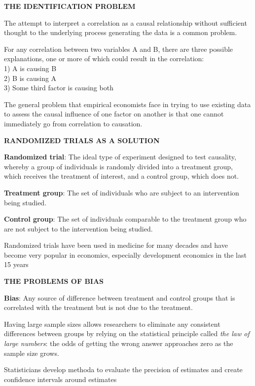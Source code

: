 \documentclass[landscape]{slides}
\begin{document}
\begin{slide}
\begin{center}
{\bf THE IDENTIFICATION PROBLEM}
\end{center}

The attempt to interpret a correlation as a causal relationship without sufficient thought to the underlying process generating the data is a common problem.

For any correlation between two variables A and B, there are three possible explanations, one or more of which could result in the correlation:\\
1) A is causing B\\
2) B is causing A\\
3) Some third factor is causing both

The general problem that empirical economists face in trying to use existing data to assess the causal influence of one factor on another is that one cannot immediately go from correlation to causation.
\end{slide}


\begin{slide}
\begin{center}
{\bf RANDOMIZED TRIALS AS A SOLUTION}
\end{center}

{\bf Randomized trial}:
The ideal type of experiment designed to test causality, whereby a group of individuals is randomly divided into a treatment group, which receives the treatment of interest, and a control group, which does not.

{\bf Treatment group}:
The set of individuals who are subject to an intervention being studied.

{\bf Control group}:
The set of individuals comparable to the treatment group who are not subject to the intervention being studied.

Randomized trials have been used in medicine for many decades and have
 become very popular in economics, especially development economics in the last 15
years
\end{slide}

\begin{slide}
\begin{center}
{\bf THE PROBLEMS OF BIAS}
\end{center}

{\bf Bias}:
Any source of difference between treatment and control groups that is correlated with the treatment but is not due to the treatment.

Having large sample sizes allows researchers to eliminate any consistent differences between groups by relying on the statistical principle called \emph{the law of large numbers}:  the odds of getting the wrong answer approaches zero as the sample size grows.

Statisticians develop methoda to evaluate the precision of estimates and create confidence intervals
around estimates
\end{slide}
\end{document}
